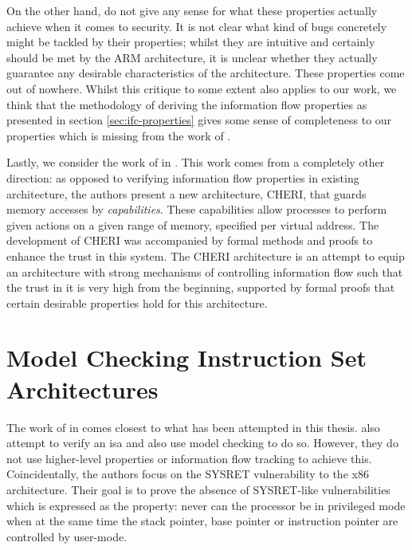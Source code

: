 On the other hand, \citeauthor{KhakpourSD13} do not give any sense for what these properties actually achieve when it comes to security.
It is not clear what kind of bugs concretely might be tackled by their properties; whilst they are intuitive and certainly should be met by the ARM architecture, it is unclear whether they actually guarantee any desirable characteristics of the architecture.
These properties come out of nowhere.
Whilst this critique to some extent also applies to our work, we think that the methodology of deriving the information flow properties as presented in section \ref{sec:ifc-properties} gives some sense of completeness to our properties which is missing from the work of \citeauthor{KhakpourSD13}.

Lastly, we consider the work of \citeauthor{Nienhuis19} in  \cite{Nienhuis19}.
This work comes from a completely other direction: as opposed to verifying information flow properties in existing architecture, the authors present a new architecture, CHERI, that guards memory accesses by \textit{capabilities}.
These capabilities allow processes to perform given actions on a given range of memory, specified per virtual address.
The development of CHERI was accompanied by formal methods and proofs to enhance the trust in this system.
The CHERI architecture is an attempt to equip an architecture with strong mechanisms of controlling information flow such that the trust in it is very high from the beginning, supported by formal proofs that certain desirable properties hold for this architecture.

\section{Model Checking Instruction Set Architectures}
\label{sec:related-model-checking}

The work of \citeauthor{BradfieldS16} in  \cite{BradfieldS16} comes closest to what has been attempted in this thesis.
\citeauthor{BradfieldS16} also attempt to verify an \gls{isa} and also use model checking to do so.
However, they do not use higher-level properties or information flow tracking to achieve this.
Coincidentally, the authors focus on the SYSRET vulnerability to the x86 architecture.
Their goal is to prove the absence of SYSRET-like vulnerabilities which is expressed as the property: never can the processor be in privileged mode when at the same time the stack pointer, base pointer or instruction pointer are controlled by user-mode.


